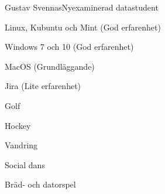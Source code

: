 \documentclass{article}
\begin{document}
\begin{cv}[avatar]{Gustav Svennas}{Nyexaminerad datastudent}
\cvseparator
\begin{cvitem}
    Linux, Kubuntu och Mint (God erfarenhet)
\end{cvitem}

\cvseparator
\begin{cvitem}
    Windows 7 och 10 (God erfarenhet)
\end{cvitem}

\cvseparator
\begin{cvitem}
    MacOS (Grundläggande)
\end{cvitem}

\cvseparator
\begin{cvitem}
    Jira (Lite erfarenhet)
\end{cvitem}






\cvseparator
\begin{cvitem}
    Golf
\end{cvitem}

\cvseparator
\begin{cvitem}
    Hockey 
\end{cvitem}

\cvseparator
\begin{cvitem}
    Vandring
\end{cvitem}

\cvseparator
\begin{cvitem}
    Social dans
\end{cvitem}

\cvseparator
\begin{cvitem}
    Bräd- och datorspel
\end{cvitem}


\end{cv}
\end{document}
